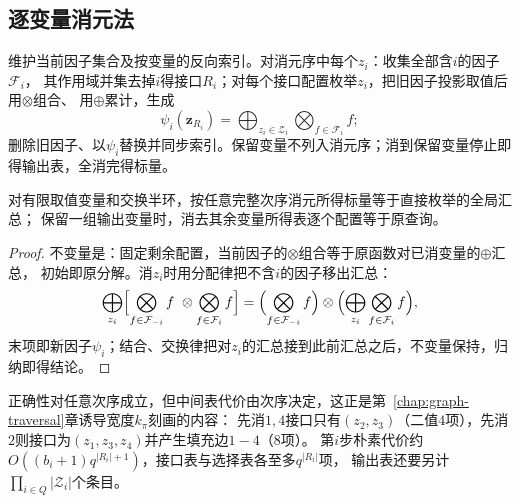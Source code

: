 \subsection{逐变量消元法}
\begin{algorithm}[变量消元]
  维护当前因子集合及按变量的反向索引。对消元序中每个$z_i$：收集全部含$i$的因子$\mathcal F_i$，
  其作用域并集去掉$i$得接口$R_i$；对每个接口配置枚举$z_i$，把旧因子投影取值后用$\otimes$组合、
  用$\oplus$累计，生成
  \[
    \psi_i(\bm z_{R_i})=\bigoplus_{z_i\in\mathcal Z_i}\bigotimes_{f\in\mathcal F_i}f;
  \]
  删除旧因子、以$\psi_i$替换并同步索引。保留变量不列入消元序；消到保留变量停止即得输出表，全消完得标量。
\end{algorithm}

\begin{theorem}[半环变量消除的正确性]
  \label{thm:graph-theory-semiring-elimination}
  对有限取值变量和交换半环，按任意完整次序消元所得标量等于直接枚举的全局汇总；
  保留一组输出变量时，消去其余变量所得表逐个配置等于原查询。
\end{theorem}
\begin{proof}
不变量是：固定剩余配置，当前因子的$\otimes$组合等于原函数对已消变量的$\oplus$汇总，
初始即原分解。消$z_i$时用分配律把不含$i$的因子移出汇总：
\[
  \bigoplus_{z_i}\Bigl[\bigotimes_{f\in\mathcal F_{-i}}f\ \otimes\bigotimes_{f\in\mathcal F_i}f\Bigr]
  =\Bigl(\bigotimes_{f\in\mathcal F_{-i}}f\Bigr)\otimes
   \Bigl(\bigoplus_{z_i}\bigotimes_{f\in\mathcal F_i}f\Bigr),
\]
末项即新因子$\psi_i$；结合、交换律把对$z_i$的汇总接到此前汇总之后，不变量保持，归纳即得结论。
\end{proof}
正确性对任意次序成立，但中间表代价由次序决定，这正是第~\ref{chap:graph-traversal}章诱导宽度$k_\pi$刻画的内容：
先消$1,4$接口只有$(z_2,z_3)$（二值$4$项），先消$2$则接口为$(z_1,z_3,z_4)$并产生填充边$1-4$（$8$项）。
第$i$步朴素代价约$O((b_i+1)q^{|R_i|+1})$，接口表与选择表各至多$q^{|R_i|}$项，
输出表还要另计$\prod_{i\in Q}|\mathcal Z_i|$个条目。
